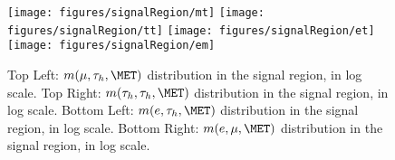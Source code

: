 \begin{figure}[tbh!]
  \centering
   \texttt{[image: figures/signalRegion/mt]}
   \texttt{[image: figures/signalRegion/tt]} 
   \texttt{[image: figures/signalRegion/et]}
   \texttt{[image: figures/signalRegion/em]}
  \caption{ Top Left: $m(\mu,\tau_{h},\MET)$ distribution in the signal region, in log scale.  Top Right: $m(\tau_{h},\tau_{h},\MET)$ distribution in 
the signal region, in log scale.  Bottom Left: $m(e,\tau_{h},\MET)$ distribution in the signal region, in log scale.  Bottom Right: $m(e,\mu,\MET)$ 
distribution in the signal region, in log scale.}
    \label{fig:SignalRegionPlot_a}
\end{figure}

